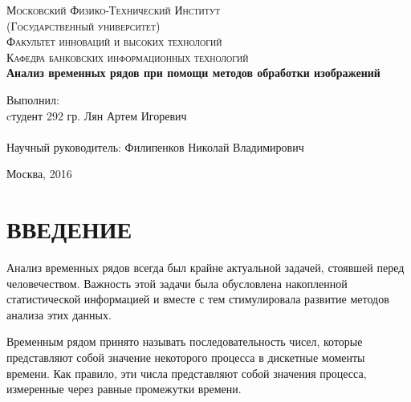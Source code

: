 \documentclass{article}
\begin{document}
\begin{titlepage}
\begin{center}


\textsc{\Large Московский Физико-Технический Институт \\ (Государственный университет)}\\[1cm]

\textsc{\normalsize Факультет инноваций и высоких технологий \\ Кафедра банковских информационных технологий}\\[3cm]

{ \huge \bfseries Анализ временных рядов при помощи методов обработки изображений \\[3cm] }

\end{center}

\noindent\textnormal{\normalsize Выполнил: \\ cтудент 292 гр. \hfill  Лян Артем Игоревич}\\[1cm]

\textnormal\textnormal{\normalsize \\ Научный руководитель:  \hfill  Филипенков Николай Владимирович}\\

\vspace{\fill} 

\begin{center}

\textnormal{Москва, 2016}

\end{center}

\thispagestyle{empty}
\end{titlepage}

\tableofcontents
\newpage

\section{ВВЕДЕНИЕ}
\par{
Анализ временных рядов всегда был крайне актуальной задачей, стоявшей перед человечеством. Важность этой задачи была обусловлена накопленной статистической информацией и вместе с тем стимулировала развитие методов анализа этих данных. 
}

\par{
Временным рядом принято называть последовательность чисел, которые представляют собой значение некоторого процесса в дискетные моменты времени. Как правило, эти числа представляют собой значения процесса, измеренные через равные промежутки времени. 
}
\end{document}
